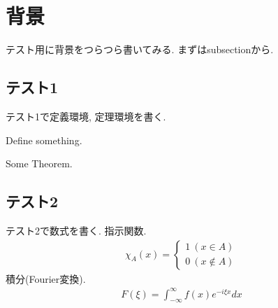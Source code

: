 \documentclass[../master/master.tex]{subfiles}
\begin{document}
    \section{背景}
    テスト用に背景をつらつら書いてみる. まずはsubsectionから.
        \subsection{テスト1}
        テスト1で定義環境, 定理環境を書く.
            \begin{dfn}
                Define something.
            \end{dfn}
            \begin{thm}
                Some Theorem.
            \end{thm}
        \subsection{テスト2}
        テスト2で数式を書く. 指示関数.
            \begin{align*}
                \mathbb{\chi}_A(x)=
                \begin{cases}
                    1\ (x\in A) \\
                    0\ (x \notin A)
                \end{cases}
            \end{align*}
        積分(Fourier変換).
            \begin{align*}
                F(\xi)
                =
                \int_{-\infty}^{\infty}
                    f(x)e^{-i\xi x}dx
            \end{align*}
\end{document}
